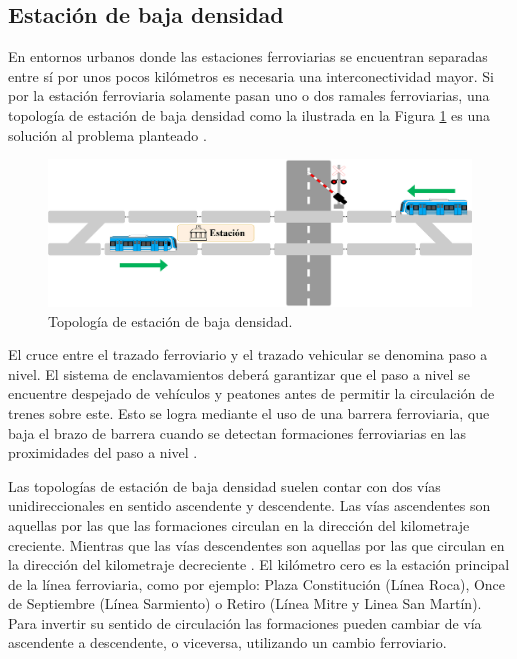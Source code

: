 \subsection{Estación de baja densidad}


En entornos urbanos donde las estaciones ferroviarias se encuentran separadas entre sí por unos pocos kilómetros es necesaria una interconectividad mayor. Si por la estación ferroviaria solamente pasan uno o dos ramales ferroviarias, una topología de estación de baja densidad como la ilustrada en la Figura \ref{fig:simple_1} es una solución al problema planteado \cite{Paper_108}.

    \begin{figure}[H]
        \centering
        \includegraphics[width=1\textwidth]{Figuras/bajaDensidad}
        \centering\caption{Topología de estación de baja densidad.}
        \label{fig:simple_1}
    \end{figure}

El cruce entre el trazado ferroviario y el trazado vehicular se denomina paso a nivel. El sistema de enclavamientos deberá garantizar que el paso a nivel se encuentre despejado de vehículos y peatones antes de permitir la circulación de trenes sobre este. Esto se logra mediante el uso de una barrera ferroviaria, que baja el brazo de barrera cuando se detectan formaciones ferroviarias en las proximidades del paso a nivel \cite{Paper_110}.

Las topologías de estación de baja densidad suelen contar con dos vías unidireccionales en sentido ascendente y descendente. 
Las vías ascendentes son aquellas por las que las formaciones circulan en la dirección del kilometraje creciente. Mientras que las vías descendentes son aquellas por las que circulan en la dirección del kilometraje decreciente \cite{RITO}. El kilómetro cero es la estación principal de la línea ferroviaria, como por ejemplo: Plaza Constitución (Línea Roca), Once de Septiembre (Línea Sarmiento) o Retiro (Línea Mitre y Linea San Martín). Para invertir su sentido de circulación las formaciones pueden cambiar de vía ascendente a descendente, o viceversa, utilizando un cambio ferroviario.